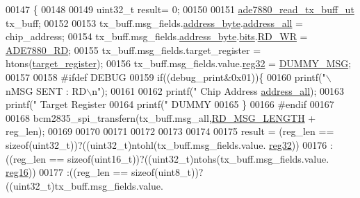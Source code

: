 \begin{DoxyCode}
00147                                                                                                     \{
00148    
00149   uint32\_t result= 0;
00150 
00151     \hyperlink{a00015}{ade7880\_read\_tx\_buff\_ut} tx\_buff;
00152     
00153     tx\_buff.msg\_fields.\hyperlink{a00015_af6a65bac733ea3e9b1d24b065163d49a}{address\_byte}.\hyperlink{a00010_a7bf6defa0ae3fb2bca057a3a97d4f740}{address\_all} = chip\_address;
00154     tx\_buff.msg\_fields.\hyperlink{a00015_af6a65bac733ea3e9b1d24b065163d49a}{address\_byte}.\hyperlink{a00010_ae121725fb28cc26495969d71e0e0d42e}{bits}.\hyperlink{a00010_a97e2668c8e5470fa66185f16dc2e8045}{RD\_WR} = \hyperlink{a00040_a30e8f63608e6153585d75dc479a03177}{ADE7880\_RD};
00155     tx\_buff.msg\_fields.target\_register = htons(\hyperlink{a00040_ac02048009fa6718e40f028b6bae63f3d}{target\_register});
00156     tx\_buff.msg\_fields.value.\hyperlink{a00015_a83e2be8d3feb1bcbc286bfaae10ac552}{reg32} = \hyperlink{a00040_af87bc226c5bc1e648d8ceac69ccf2bcb}{DUMMY\_MSG};
00157 
00158 \textcolor{preprocessor}{    #ifdef DEBUG}
00159 \textcolor{preprocessor}{}     \textcolor{keywordflow}{if}((debug\_print&0x01))\{
00160        printf(\textcolor{stringliteral}{"\(\backslash\)nMSG SENT  : RD\(\backslash\)n"});
00161        
00162        printf(\textcolor{stringliteral}{"        Chip Address %
      \hyperlink{a00010_a7bf6defa0ae3fb2bca057a3a97d4f740}{address\_all});
00163        printf(\textcolor{stringliteral}{"        Target Register %
00164        printf(\textcolor{stringliteral}{"        DUMMY %
00165        \}
00166 \textcolor{preprocessor}{    #endif}
00167 \textcolor{preprocessor}{}    
00168     bcm2835\_spi\_transfern(tx\_buff.msg\_all,\hyperlink{a00040_a0f0795755fb9e8e47c78c1289e091282}{RD\_MSG\_LENGTH} + reg\_len);    
00169     
00170     
00171               
00172     
00173     
00174     
00175     result =  (reg\_len == \textcolor{keyword}{sizeof}(uint32\_t))?((uint32\_t)ntohl(tx\_buff.msg\_fields.value.
      \hyperlink{a00015_a83e2be8d3feb1bcbc286bfaae10ac552}{reg32}))
00176              :((reg\_len == \textcolor{keyword}{sizeof}(uint16\_t))?((uint32\_t)ntohs(tx\_buff.msg\_fields.value.
      \hyperlink{a00015_a0c22d234d52e616d449a8c264bf2030b}{reg16}))
00177              :((reg\_len == \textcolor{keyword}{sizeof}(uint8\_t))?((uint32\_t)tx\_buff.msg\_fields.value.
}}}
\end{DoxyCode}

